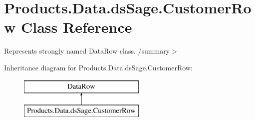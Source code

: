 \hypertarget{class_products_1_1_data_1_1ds_sage_1_1_customer_row}{}\section{Products.\+Data.\+ds\+Sage.\+Customer\+Row Class Reference}
\label{class_products_1_1_data_1_1ds_sage_1_1_customer_row}


Represents strongly named Data\+Row class. /summary$>$  


Inheritance diagram for Products.\+Data.\+ds\+Sage.\+Customer\+Row\+:\begin{figure}[H]
\begin{center}
\leavevmode
\includegraphics[height=2.000000cm]{class_products_1_1_data_1_1ds_sage_1_1_customer_row}
\end{center}
\end{figure}

